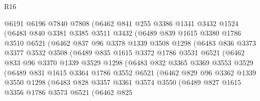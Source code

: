 \begin{lexlean}{R16}
\begin{coremodule}
            @6191
            @6196
            @7840
            @7808
            (@6462
              @841
              @255
              @3386
              @1341
              @3432
              @1524
              (@6483
                @840
                @3381
                @3385
                @3511
                @3432
                (@6489
                  @839
                  @1615
                  @3380
                  @1786
                  @3510
                  @6521
                  (@6462
                    @837
                    @96
                    @3378
                    @1339
                    @3508
                    @1298
                    (@6483
                      @836
                      @3373
                      @3377
                      @3532
                      @3508
                      (@6489
                        @835
                        @1615
                        @3372
                        @1786
                        @3531
                        @6521
                        (@6462
                          @833
                          @96
                          @3370
                          @1339
                          @3529
                          @1298
                          (@6483
                            @832
                            @3365
                            @3369
                            @3553
                            @3529
                            (@6489
                              @831
                              @1615
                              @3364
                              @1786
                              @3552
                              @6521
                              (@6462
                                @829
                                @96
                                @3362
                                @1339
                                @3550
                                @1298
                                (@6483
                                  @828
                                  @3357
                                  @3361
                                  @3574
                                  @3550
                                  (@6489
                                    @827
                                    @1615
                                    @3356
                                    @1786
                                    @3573
                                    @6521
                                    (@6462
                                      @825

\end{coremodule}
\end{lexlean}
